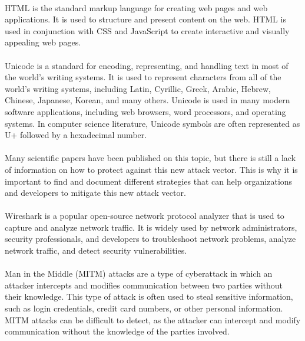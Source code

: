 \documentclass[12pt]{scrbook}
\begin{document}
\paragraph{}
HTML is the standard markup language for creating web pages
and web applications. It is used to structure and present content on the web.
HTML is used in conjunction with CSS and JavaScript to create interactive and
visually appealing web pages.

\paragraph{}
Unicode is a standard for encoding,
representing, and handling text in most of the world's writing systems. It is
used to represent characters from all of the world's writing systems, including
Latin, Cyrillic, Greek, Arabic, Hebrew, Chinese, Japanese, Korean, and many
others. Unicode is used in many modern software applications, including web
browsers, word processors, and operating systems. In computer science
literature, Unicode symbols are often represented as U+ followed by a
hexadecimal number.

\paragraph{}
Many scientific papers have been published on this
topic, but there is still a lack of information on how to protect against this
new attack vector. This is why it is important to find and document different
strategies that can help organizations and developers to mitigate this new
attack vector.

\paragraph{}
Wireshark is a popular open-source network protocol
analyzer that is used to capture and analyze network traffic. It is widely used
by network administrators, security professionals, and developers to
troubleshoot network problems, analyze network traffic, and detect security
vulnerabilities.

\paragraph{}
Man in the Middle (MITM) attacks are a type of
cyberattack in which an attacker intercepts and modifies communication between
two parties without their knowledge. This type of attack is often used to steal
sensitive information, such as login credentials, credit card numbers, or other
personal information. MITM attacks can be difficult to detect, as the attacker
can intercept and modify communication without the knowledge of the parties
involved.
\end{document}

